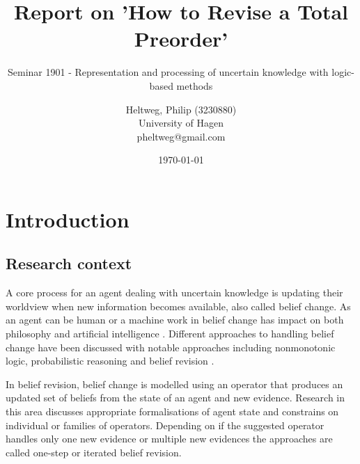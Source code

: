 \documentclass[11pt]{scrartcl}
\begin{document}
\title{Report on 'How to Revise a Total Preorder' \cite{Booth2011}}
\subtitle{Seminar 1901 - Representation and processing of uncertain knowledge with logic-based methods}
\author{
	Heltweg, Philip (3230880) \\
	University of Hagen \\
	pheltweg@gmail.com
}
\date{\today}
\maketitle


\newpage

\tableofcontents

\newpage

\section{Introduction}
\subsection{Research context}
A core process for an agent dealing with uncertain knowledge is updating their worldview when new information becomes available, also called belief change. As an agent can be human or a machine work in belief change has impact on both philosophy and artificial intelligence \cite{Ferme2011}. Different approaches to handling belief change have been discussed with notable approaches including nonmonotonic logic, probabilistic reasoning and belief revision \cite{Darwiche1997}.

In belief revision, belief change is modelled using an operator that produces an updated set of beliefs from the state of an agent and new evidence. Research in this area discusses appropriate formalisations of agent state and constrains on individual or families of operators. Depending on if the suggested operator handles only one new evidence or multiple new evidences the approaches are called one-step or iterated belief revision.
\end{document}
